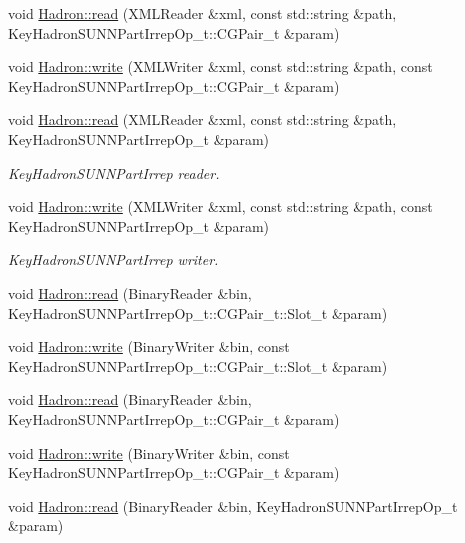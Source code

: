 \begin{DoxyCompactItemize}
\item 
void \mbox{\hyperlink{namespaceHadron_adc5eb75838fc176e1641d6264c9a894d}{Hadron\+::read}} (X\+M\+L\+Reader \&xml, const std\+::string \&path, Key\+Hadron\+S\+U\+N\+N\+Part\+Irrep\+Op\+\_\+t\+::\+C\+G\+Pair\+\_\+t \&param)
\item 
void \mbox{\hyperlink{namespaceHadron_a835e4515b6f5e491ce57ac5169196d90}{Hadron\+::write}} (X\+M\+L\+Writer \&xml, const std\+::string \&path, const Key\+Hadron\+S\+U\+N\+N\+Part\+Irrep\+Op\+\_\+t\+::\+C\+G\+Pair\+\_\+t \&param)
\item 
void \mbox{\hyperlink{namespaceHadron_a6ee3d9a9ffb4f6e626fa1a73b49c9ee0}{Hadron\+::read}} (X\+M\+L\+Reader \&xml, const std\+::string \&path, Key\+Hadron\+S\+U\+N\+N\+Part\+Irrep\+Op\+\_\+t \&param)
\begin{DoxyCompactList}\small\item\em Key\+Hadron\+S\+U\+N\+N\+Part\+Irrep reader. \end{DoxyCompactList}\item 
void \mbox{\hyperlink{namespaceHadron_a04a5b512d84ea116e0714765e22cbc30}{Hadron\+::write}} (X\+M\+L\+Writer \&xml, const std\+::string \&path, const Key\+Hadron\+S\+U\+N\+N\+Part\+Irrep\+Op\+\_\+t \&param)
\begin{DoxyCompactList}\small\item\em Key\+Hadron\+S\+U\+N\+N\+Part\+Irrep writer. \end{DoxyCompactList}\item 
void \mbox{\hyperlink{namespaceHadron_a5927f6c6b145b1ae72a2bc9461e617ca}{Hadron\+::read}} (Binary\+Reader \&bin, Key\+Hadron\+S\+U\+N\+N\+Part\+Irrep\+Op\+\_\+t\+::\+C\+G\+Pair\+\_\+t\+::\+Slot\+\_\+t \&param)
\item 
void \mbox{\hyperlink{namespaceHadron_ad5c8dc860360f98655b29f17b61f2a35}{Hadron\+::write}} (Binary\+Writer \&bin, const Key\+Hadron\+S\+U\+N\+N\+Part\+Irrep\+Op\+\_\+t\+::\+C\+G\+Pair\+\_\+t\+::\+Slot\+\_\+t \&param)
\item 
void \mbox{\hyperlink{namespaceHadron_ae56ab02908d10b1a8e5c2bad920dfe5a}{Hadron\+::read}} (Binary\+Reader \&bin, Key\+Hadron\+S\+U\+N\+N\+Part\+Irrep\+Op\+\_\+t\+::\+C\+G\+Pair\+\_\+t \&param)
\item 
void \mbox{\hyperlink{namespaceHadron_a53c6ec066bb836eb7474a8a18be8fea7}{Hadron\+::write}} (Binary\+Writer \&bin, const Key\+Hadron\+S\+U\+N\+N\+Part\+Irrep\+Op\+\_\+t\+::\+C\+G\+Pair\+\_\+t \&param)
\item 
void \mbox{\hyperlink{namespaceHadron_a05878acca51117e3c410ba16500c4ba5}{Hadron\+::read}} (Binary\+Reader \&bin, Key\+Hadron\+S\+U\+N\+N\+Part\+Irrep\+Op\+\_\+t \&param)

\end{DoxyCompactItemize}
